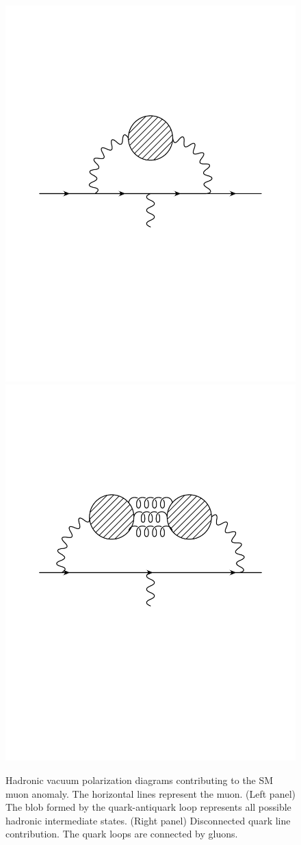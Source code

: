 \begin{figure}[bp]
    \centering
    \includegraphics[width=0.3\columnwidth]{ChargedLeptons/Figures/hvp.pdf}\hskip 1cm
    \includegraphics[width=0.3\columnwidth]{ChargedLeptons/Figures/hvp-disc.pdf}
\caption{Hadronic vacuum polarization diagrams contributing to the SM muon anomaly. The horizontal lines represent the muon. (Left panel) The blob formed by the quark-antiquark loop represents all possible hadronic intermediate states.  (Right panel) Disconnected quark line contribution. The quark loops are connected by gluons.}

    \label{fig:hvp}
\end{figure}
%

